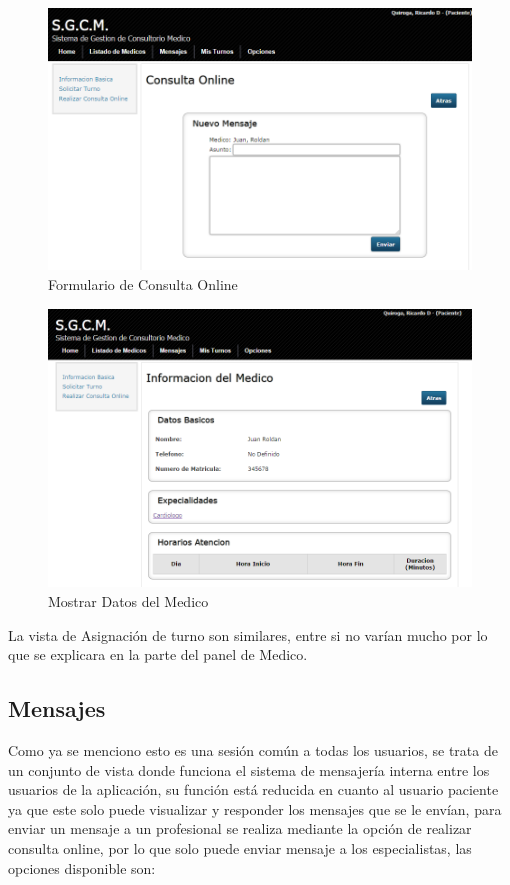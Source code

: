 \begin{figure}[H]
    \centering
    \includegraphics[scale=0.5]{resourse/consulta-online.png}
    \caption{Formulario de Consulta Online}
    \label{fig:68}
\end{figure}

\begin{figure}[H]
    \centering
    \includegraphics[scale=0.5]{resourse/medico-mostrar.png}
    \caption{Mostrar Datos del Medico}
    \label{fig:69}
\end{figure}

La vista de Asignación de turno son similares, entre si no varían mucho por lo que se explicara en la parte del panel de Medico.


\subsection{Mensajes}

Como ya se menciono esto es una sesión común a todas los usuarios, se trata de un conjunto de vista donde funciona el sistema de mensajería interna entre los usuarios de la aplicación, su función está reducida en cuanto al usuario paciente ya que este solo puede visualizar y responder los mensajes que se le envían, para enviar un mensaje a un profesional se realiza mediante la opción de realizar consulta online, por lo que solo puede enviar mensaje a los especialistas, las opciones disponible son:

